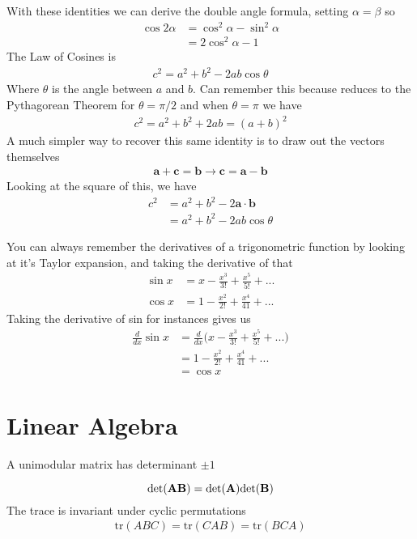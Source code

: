 With these identities we can derive the double angle formula, setting $\alpha = \beta$ so
\begin{align}
\cos2\alpha &= \cos^2\alpha -\sin^2\alpha\\
&= 2\cos^2\alpha-1
\end{align}
The Law of Cosines is 
\begin{align}
c^2 = a^2 + b^2 -2ab\cos\theta
\end{align}
Where $\theta$ is the angle between $a$ and $b$. Can remember this because reduces to the Pythagorean Theorem for $\theta = \pi/2$ and when $\theta = \pi$ we have
\begin{align}
c^2 = a^2 + b^2 +2ab = (a+b)^2
\end{align}
A much simpler way to recover this same identity is to draw out the vectors themselves
\begin{align}
	\textbf{a} + \textbf{c} = \textbf{b} \rightarrow \textbf{c} = \textbf{a} - \textbf{b}
\end{align}
Looking at the square of this, we have
\begin{align}
	c^2 &= a^2 + b^2 - 2\textbf{a}\cdot\textbf{b}\\
	&= a^2 + b^2 -2ab\cos\theta 
\end{align}

You can always remember the derivatives of a trigonometric function by looking at it's Taylor expansion, and taking the derivative of that
\begin{align}
	\sin x &= x - \frac{x^3}{3!} + \frac{x^5}{5!} + ...\\
	\cos x &= 1 - \frac{x^2}{2!} + \frac{x^4}{41} + ...
\end{align}
Taking the derivative of sin for instances gives us
\begin{align}
	\frac{d}{dx}\sin x &= \frac{d}{dx}\Big( x - \frac{x^3}{3!} + \frac{x^5}{5!} + ...\Big)\\
	&= 1 - \frac{x^2}{2!} + \frac{x^4}{41} + ...\\
	&= \cos x
\end{align}

\section{Linear Algebra}
A unimodular matrix has determinant $\pm 1$


$$\rm{det}(\bf{AB}) = \rm{det}(\bf{A})\rm{det}(\bf{B})$$
The trace is invariant under cyclic permutations
\begin{align}
	\textrm{tr}(ABC) = \textrm{tr}(CAB) = \textrm{tr}(BCA)
\end{align}


